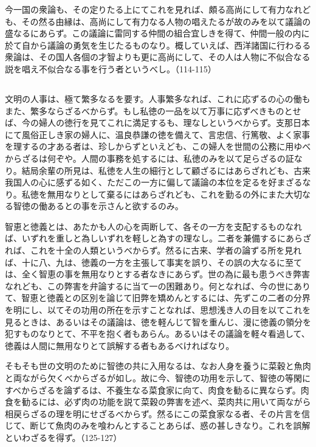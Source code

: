 今一国の衆論も、その定りたる上にてこれを見れば、頗る高尚にして有力なれども、その然る由縁は、高尚にして有力なる人物の唱えたるが故のみを以て議論の盛なるにあらず。この議論に雷同する仲間の組合宜しきを得て、仲間一般の内に於て自から議論の勇気を生じたるものなり。概していえば、西洋諸国に行わるる衆論は、その国人各個の才智よりも更に高尚にして、その人は人物に不似合なる説を唱え不似合なる事を行う者というべし。（114-115）

\subsection{}
\label{sec:5}




文明の人事は、極て繁多なるを要す。人事繁多なれば、これに応ずるの心の働もまた、繁多ならざるべからず。もし私徳の一品を以て万事に応ずべきものとせば、今の婦人の徳行を見てこれに満足するも、理なしというべからず。支那日本にて風俗正しき家の婦人に、温良恭謙の徳を備えて、言忠信、行篤敬、よく家事を理するの才ある者は、珍しからずといえども、この婦人を世間の公務に用ゆべからざるは何ぞや。人間の事務を処するには、私徳のみを以て足らざるの証なり。結局余輩の所見は、私徳を人生の細行として顧ざるにはあらざれども、古来我国人の心に感ずる如く、ただこの一方に偏して議論の本位を定るを好まざるなり。私徳を無用なりとして棄るにはあらざれども、これを勤るの外にまた大切なる智徳の働あるとの事を示さんと欲するのみ。

智恵と徳義とは、あたかも人の心を両断して、各その一方を支配するものなれば、いずれを重しと為しいずれを軽しと為すの理なし。二者を兼備するにあらざれば、これを十全の人類というべからず。然るに古来、学者の論ずる所を見れば、十に八、九は、徳義の一方を主張して事実を誤り、その誤の大なるに至ては、全く智恵の事を無用なりとする者なきにあらず。世の為に最も患うべき弊害なれども、この弊害を弁論するに当て一の困難あり。何となれば、今の世にありて、智恵と徳義との区別を論じて旧弊を矯めんとするには、先ずこの二者の分界を明にし、以てその功用の所在を示すことなれば、思想浅き人の目を以てこれを見るときは、あるいはその議論は、徳を軽んじて智を重んじ、漫に徳義の領分を犯すものなりとて、不平を抱く者もあらん。あるいはその議論を軽々看過して、徳義は人間に無用なりとて誤解する者もあるべければなり。

そもそも世の文明のために智徳の共に入用なるは、なお人身を養うに菜穀と魚肉と両ながら欠くべからざるが如し。故に今、智徳の功用を示して、智徳の等閑にすべからざるを論ずるは、不養生なる菜食家に向て、肉食を勧るに異ならず。肉食を勧るには、必ず肉の功能を説て菜穀の弊害を述べ、菜肉共に用いて両ながら相戻らざるの理を明にせざるべからず。然るにこの菜食家なる者、その片言を信じて、断じて魚肉のみを喰わんとすることあらば、惑の甚しきなり。これを誤解といわざるを得ず。（125-127）

